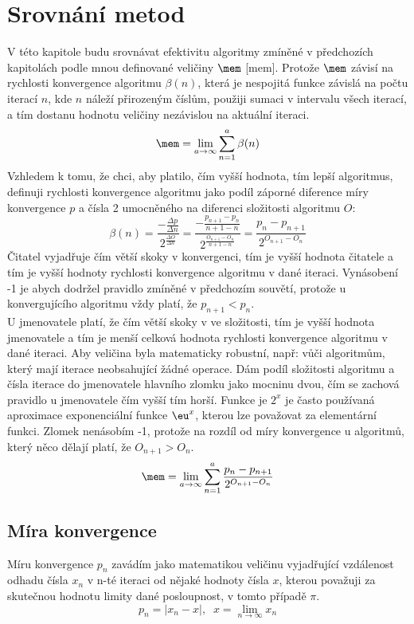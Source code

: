 \documentclass[rocnikovka]{gzwroc} %
\begin{document}
\section{Srovnání metod}
V této kapitole budu srovnávat efektivitu algoritmy zmíněné v předchozích kapitolách podle mnou definované veličiny $\mem$ [mem]. Protože $\mem$ závisí na rychlosti konvergence algoritmu $\beta(n)$, která je nespojitá funkce závislá na počtu iterací $n$, kde $n$ náleží přirozeným číslům, použiji sumaci v intervalu všech iterací, a tím dostanu hodnotu veličiny nezávislou na aktuální iteraci.
$$
\mem=\lim_{a\to\infty} \sum_{n=1}^{a}\beta(n)
$$
Vzhledem k tomu, že chci, aby platilo, čím vyšší hodnota, tím lepší algoritmus, definuji rychlosti konvergence algoritmu jako podíl záporné diference míry konvergence $p$ a čísla 2 umocněného na diferenci složitosti algoritmu $O$:
$$
\beta(n)=\frac{-\frac{\Delta p}{\Delta n}}{2^{\frac{\Delta O}{\Delta n}}}=\frac{-\frac{p_{n+1}-p_n}{n+1-n}}{2^{\frac{O_{n+1}-O_n}{n+1-n}}}=\frac{p_n-p_{n+1}}{2^{O_{n+1}-O_n}}
$$
Čitatel vyjadřuje čím větší skoky v konvergenci, tím je vyšší hodnota čitatele a tím je vyšší hodnoty rychlosti konvergence algoritmu v dané iteraci. Vynásobení -1 je abych dodržel pravidlo zmíněné v předchozím souvětí, protože u konvergujícího algoritmu vždy platí, že $p_{n+1}<p_n$.\\
U jmenovatele platí, že čím větší skoky v ve složitosti, tím je vyšší hodnota jmenovatele a tím je menší celková hodnota rychlosti konvergence algoritmu v dané iteraci. Aby veličina byla matematicky robustní, např: vůči algoritmům, který mají iterace neobsahující žádné operace. Dám podíl složitosti algoritmu a čísla iterace do jmenovatele hlavního zlomku jako mocninu dvou, čím se zachová pravidlo u jmenovatele čím vyšší tím horší. Funkce je $2^x$ je často používaná aproximace exponenciální funkce $\eu^x$, kterou lze považovat za elementární funkci. Zlomek nenásobím -1, protože na rozdíl od míry konvergence u algoritmů, který něco dělají platí, že $O_{n+1}>O_n$.
\begin{equation}
\mem=\lim_{a\to\infty} \sum_{n=1}^{a}\frac{p_n-p_{n+1}}{2^{O_{n+1}-O_n}}
\end{equation}

\subsection{Míra konvergence}
Míru konvergence $p_n$ zavádím jako matematikou veličinu vyjadřující vzdálenost odhadu čísla $x_n$ v n-té iteraci od nějaké hodnoty čísla $x$, kterou považuji za skutečnou hodnotu limity dané posloupnost, v tomto případě $\pi$.
$$
p_n=|x_n-x|, \;\; x=\lim_{n\to\infty} x_n
$$
\end{document}
